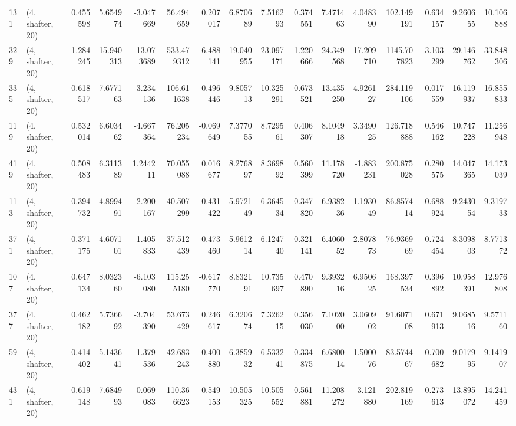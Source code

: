 \begin{tabular}{llrrrrrrrrrrrrrr}
131 &  (4, shafter, 20) &   0.455598 &   5.654974 &  -3.047669 &    56.494659 &   0.207017 &   6.870689 &   7.516293 &  0.374551 &   7.471463 &   4.048390 &    102.149191 &    0.634157 &    9.260655 &   10.106888 \\
329 &  (4, shafter, 20) &   1.284245 &  15.940313 & -13.073689 &   533.479312 &  -6.488141 &  19.040955 &  23.097171 &  1.220666 &  24.349568 &  17.209710 &   1145.707823 &   -3.103299 &   29.146762 &   33.848306 \\
335 &  (4, shafter, 20) &   0.618517 &   7.677163 &  -3.234136 &   106.611638 &  -0.496446 &   9.805713 &  10.325291 &  0.673521 &  13.435250 &   4.926127 &    284.119106 &   -0.017559 &   16.119937 &   16.855833 \\
119 &  (4, shafter, 20) &   0.532014 &   6.603462 &  -4.667364 &    76.205234 &  -0.069649 &   7.377055 &   8.729561 &  0.406307 &   8.104918 &   3.349025 &    126.718888 &    0.546162 &   10.747228 &   11.256948 \\
419 &  (4, shafter, 20) &   0.508483 &   6.311389 &   1.244211 &    70.055088 &   0.016677 &   8.276897 &   8.369892 &  0.560399 &  11.178720 &  -1.883231 &    200.875028 &    0.280575 &   14.047365 &   14.173039 \\
113 &  (4, shafter, 20) &   0.394732 &   4.899491 &  -2.200167 &    40.507299 &   0.431422 &   5.972149 &   6.364534 &  0.347820 &   6.938236 &   1.193049 &     86.857414 &    0.688924 &    9.243054 &    9.319733 \\
371 &  (4, shafter, 20) &   0.371175 &   4.607101 &  -1.405833 &    37.512439 &   0.473460 &   5.961214 &   6.124740 &  0.321141 &   6.406052 &   2.807873 &     76.936969 &    0.724454 &    8.309803 &    8.771372 \\
107 &  (4, shafter, 20) &   0.647134 &   8.032360 &  -6.103080 &   115.255180 &  -0.617770 &   8.832191 &  10.735697 &  0.470890 &   9.393216 &   6.950625 &    168.397534 &    0.396892 &   10.958391 &   12.976808 \\
377 &  (4, shafter, 20) &   0.462182 &   5.736692 &  -3.704390 &    53.673429 &   0.246617 &   6.320674 &   7.326215 &  0.356030 &   7.102000 &   3.060902 &     91.607108 &    0.671913 &    9.068516 &    9.571160 \\
59  &  (4, shafter, 20) &   0.414402 &   5.143641 &  -1.379536 &    42.683243 &   0.400880 &   6.385932 &   6.533241 &  0.334875 &   6.680014 &   1.500076 &     83.574467 &    0.700682 &    9.017995 &    9.141907 \\
431 &  (4, shafter, 20) &   0.619148 &   7.684993 &  -0.069083 &   110.366623 &  -0.549153 &  10.505325 &  10.505552 &  0.561881 &  11.208272 &  -3.121880 &    202.819169 &    0.273613 &   13.895072 &   14.241459 \\

\end{tabular}
